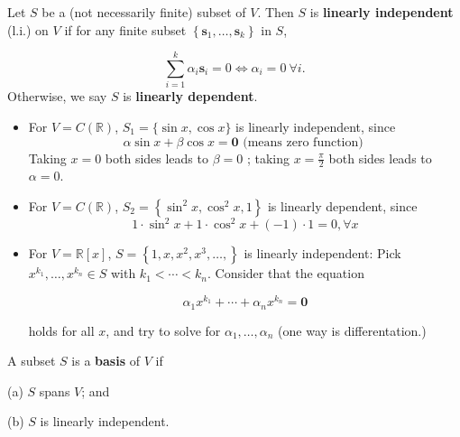 \begin{definition} Let \(S\) be a (not necessarily finite) subset of \(V\). Then \(S\) is {\bf linearly independent} (l.i.) on \(V\) if for any finite subset \(\left\{  {{\mathbf{s}}_1,\ldots ,{\mathbf{s}}_{k}}\right\}\) in \(S\),

\[
\mathop{\sum }\limits_{{i = 1}}^{k}\alpha_{i}{\mathbf{s}}_{i} = 0 \Leftrightarrow  \alpha_{i} = 0\ \forall i.
\]
Otherwise, we say $S$ is {\bf linearly dependent}.
\end{definition}

\begin{example}
\leavevmode
\begin{itemize}
\item For \(V = C\left( \mathbb{R}\right)\), \({S}_1 = \{ \sin x,\cos x\}\) is linearly independent, since
\[
\alpha \sin x + \beta \cos x = \mathbf{0}\text{ (means zero function) }
\]
Taking \(x = 0\) both sides leads to \(\beta  = 0\) ; taking \(x = \frac{\pi }2\) both sides leads to \(\alpha  = 0\).

\item For \(V = C\left( \mathbb{R}\right)\), \({S}_2 = \left\{  {{\sin }^2x,{\cos }^2x,1}\right\}\) is linearly dependent, since
\[
1 \cdot  {\sin }^2x + 1 \cdot  {\cos }^2x + \left( {-1}\right)  \cdot  1 = 0,\forall x
\]

\item For \(V = \mathbb{R}\left\lbrack  x\right\rbrack\), \(S = \left\{  {1,x,{x}^2,{x}^{3},\ldots ,}\right\}\) is linearly independent: Pick \({x}^{{k}_1},\ldots ,{x}^{{k}_n} \in  S\) with \({k}_1 < \cdots  < {k}_n\). Consider that the equation

\[
\alpha_1{x}^{{k}_1} + \cdots  + \alpha_n{x}^{{k}_n} = \mathbf{0}
\]

holds for all \(x\), and try to solve for \(\alpha_1,\ldots ,\alpha_n\) (one way is differentation.)
\end{itemize}
\end{example}


\begin{definition}[Basis] A subset \(S\) is a {\bf basis} of \(V\) if

(a) \(S\) spans \(V\); and

(b) \(S\) is linearly independent.
\end{definition}

